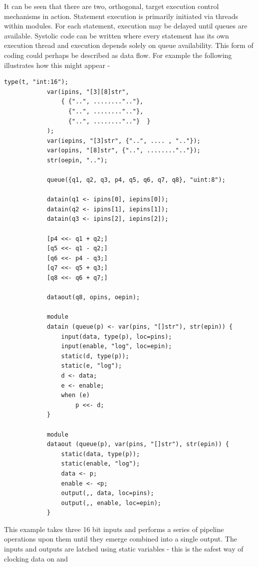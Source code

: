         It can be seen that there are two, orthogonal, target execution control
        mechanisms in action. Statement execution is primarily initiated via threads
        within modules. For each statement, execution may be delayed until queues are
        available. Systolic code can be written where every statement has its own
        execution thread and execution depends solely on queue availability. This form
        of coding could perhaps be described as data flow. For example the following
        illustrates how this might appear -
        \begin{lstlisting}[language=threepl]
            type(t, "int:16");
            var(ipins, "[3][8]str",
                { {"..", ........".."},
                  {"..", ........".."},
                  {"..", ........".."}  }
            );
            var(iepins, "[3]str", {"..", .... , ".."});
            var(opins, "[8]str", {"..", ........".."});
            str(oepin, "..");

            queue({q1, q2, q3, p4, q5, q6, q7, q8}, "uint:8");

            datain(q1 <- ipins[0], iepins[0]);
            datain(q2 <- ipins[1], iepins[1]);
            datain(q3 <- ipins[2], iepins[2]);

            [p4 <<- q1 + q2;]
            [q5 <<- q1 - q2;]
            [q6 <<- p4 - q3;]
            [q7 <<- q5 + q3;]
            [q8 <<- q6 + q7;]

            dataout(q8, opins, oepin);

            module
            datain (queue(p) <- var(pins, "[]str"), str(epin)) {
                input(data, type(p), loc=pins);
                input(enable, "log", loc=epin);
                static(d, type(p));
                static(e, "log");
                d <- data;
                e <- enable;
                when (e)
                    p <<- d;
            }

            module
            dataout (queue(p), var(pins, "[]str"), str(epin)) {
                static(data, type(p));
                static(enable, "log");
                data <- p;
                enable <- <p;                
                output(,, data, loc=pins);
                output(,, enable, loc=epin);
            }
        \end{lstlisting}
        This example takes three 16 bit inputs and performs a series of pipeline operations
        upon them until they emerge combined into a single output. The inputs and outputs
        are latched using static variables - this is the safest way of clocking data on and
